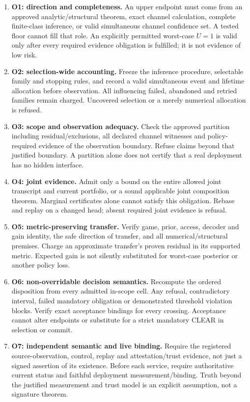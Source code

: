 \begin{enumerate}
\item \textbf{O1: direction and completeness.}
An upper endpoint must come from an approved analytic/structural theorem,
exact channel calculation, complete finite-class inference, or valid
simultaneous channel confidence set. A tested floor cannot fill that role.
An explicitly permitted worst-case $U=1$ is valid only after every required
evidence obligation is fulfilled; it is not evidence of low risk.
\item \textbf{O2: selection-wide accounting.}
Freeze the inference procedure, selectable family and stopping rules, and
record a valid simultaneous event and lifetime allocation before observation.
All influencing failed, abandoned and retried families remain charged.
Uncovered selection or a merely numerical allocation is refused.
\item \textbf{O3: scope and observation adequacy.}
Check the approved partition including residual/exclusions, all declared
channel witnesses and policy-required evidence of the observation boundary.
Refuse claims beyond that justified boundary. A partition alone does not
certify that a real deployment has no hidden interface.
\item \textbf{O4: joint evidence.}
Admit only a bound on the entire allowed joint transcript and current
portfolio, or a sound applicable joint composition theorem. Marginal
certificates alone cannot satisfy this obligation. Rebase and replay on a
changed head; absent required joint evidence is refusal.
\item \textbf{O5: metric-preserving transfer.}
Verify game, prior, access, decoder and gain identity, the safe direction of
transfer, and all numerical/structural premises. Charge an approximate
transfer's proven residual in its supported metric. Expected gain is not
silently substituted for worst-case posterior or another policy loss.
\item \textbf{O6: non-overridable decision semantics.}
Recompute the ordered disposition from every admitted in-scope cell.
Any refusal, contradictory interval, failed mandatory obligation or
demonstrated threshold violation blocks. Verify exact acceptance bindings
for every crossing. Acceptance cannot alter endpoints or substitute for
a strict mandatory CLEAR in selection or commit.
\item \textbf{O7: independent semantic and live binding.}
Require the registered source-observation, control, replay and
attestation/trust evidence, not just a signed assertion of its existence.
Before each service, require authoritative current status and faithful
deployment measurement/binding. Truth beyond the justified measurement
and trust model is an explicit assumption, not a signature theorem.
\end{enumerate}

